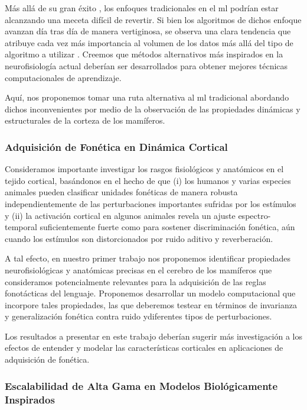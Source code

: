 Más allá de su gran éxito \cite{lecun_deep_2015}, los enfoques tradicionales en el \gls{ml} podrían estar alcanzando una meceta difícil de revertir.
Si bien los algoritmos de dichos enfoque avanzan día tras día de manera vertiginosa, se observa una clara tendencia que atribuye cada vez más importancia al volumen de los datos más allá del tipo de algoritmo a utilizar \cite{PPR:PPR91722}.
Creemos que métodos alternativos más inspirados en la neurofisiología actual deberían ser desarrollados para obtener mejores técnicas computacionales de aprendizaje.

Aquí, nos proponemos tomar una ruta alternativa al \gls{ml} tradicional abordando dichos inconvenientes por medio de la observación de las propiedades dinámicas y estructurales de la corteza de los mamíferos.


\subsubsection{Adquisición de Fonética en Dinámica Cortical}

Consideramos importante investigar los rasgos fisiológicos y anatómicos en el tejido cortical,
basándonos en el hecho de que (i) los humanos y varias especies animales pueden clasificar unidades fonéticas de manera robusta independientemente de las perturbaciones importantes sufridas por los estímulos y (ii) la activación cortical en algunos animales revela un ajuste espectro-temporal suficientemente fuerte como para sostener discriminación fonética, aún cuando los estímulos son distorcionados por ruido aditivo y reverberación.

A tal efecto, en nuestro primer trabajo nos proponemos identificar propiedades neurofisiológicas y anatómicas precisas en el cerebro de los mamíferos que consideramos potencialmente relevantes para la adquisición de las reglas fonotácticas del lenguaje.
Proponemos desarrollar un modelo computacional que incorpore tales propiedades, las que deberemos testear en términos de invarianza y generalización fonética contra ruido ydiferentes tipos de perturbaciones.

Los resultados a presentar en este trabajo deberían sugerir más investigación a los efectos de entender y modelar las características corticales en aplicaciones de adquisición de fonética.




\subsubsection{Escalabilidad de Alta Gama en Modelos Biológicamente Inspirados}

